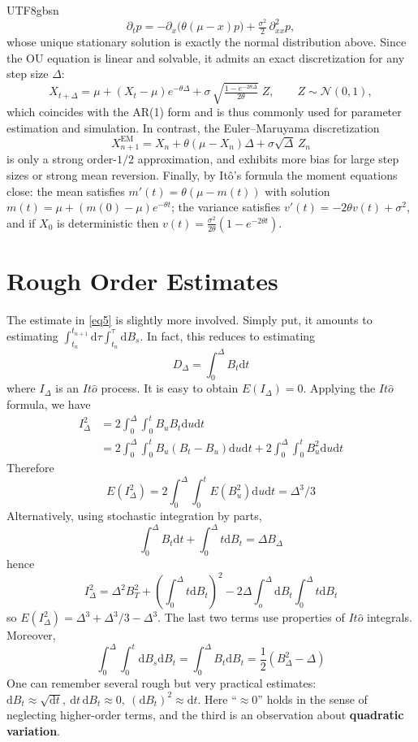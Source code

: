 \documentclass{article}
\begin{document}
\begin{CJK*}{UTF8}{gbsn}
\[
  \partial_t p = -\partial_x\!\big(\theta(\mu-x)p\big)+\tfrac{\sigma^2}{2}\,\partial_{xx}^2 p,
\]
whose unique stationary solution is exactly the normal distribution above. Since the OU equation is linear and solvable, it admits an exact discretization for any step size $\Delta$:
\[
  X_{t+\Delta}=\mu+(X_t-\mu)e^{-\theta\Delta}
  +\sigma\,\sqrt{\tfrac{1-e^{-2\theta\Delta}}{2\theta}}\;Z,\qquad Z\sim\mathcal{N}(0,1),
\]
which coincides with the AR(1) form and is thus commonly used for parameter estimation and simulation. In contrast, the Euler–Maruyama discretization
\[
  X_{n+1}^{\text{EM}}=X_n+\theta(\mu-X_n)\Delta+\sigma\sqrt{\Delta}\,Z_n
\]
is only a strong order-$1/2$ approximation, and exhibits more bias for large step sizes or strong mean reversion. Finally, by Itô’s formula the moment equations close: the mean satisfies $m'(t)=\theta(\mu-m(t))$ with solution $m(t)=\mu+(m(0)-\mu)e^{-\theta t}$; the variance satisfies $v'(t)=-2\theta v(t)+\sigma^2$, and if $X_0$ is deterministic then $v(t)=\frac{\sigma^2}{2\theta}(1-e^{-2\theta t})$.

\appendix
\section{Rough Order Estimates\label{AppendixA}}
The estimate in \ref{eq5} is slightly more involved. Simply put, it amounts to estimating $\int_{t_n}^{t_{n+1}}\mathrm{d}\tau\int_{t_n}^\tau\mathrm{d}B_s$. In fact, this reduces to estimating
$$
D_\Delta=\int_{0}^{\Delta} B_t\mathrm{d}t
$$
where $I_\Delta$ is an $It\hat{o}$ process. It is easy to obtain $E(I_\Delta)=0$. Applying the $It\hat{o}$ formula, we have
$$\begin{aligned}
I_\Delta^2
&=2\int_0^\Delta\int_0^tB_uB_t\mathrm{d}u\mathrm{d}t\\
&=2\int^\Delta_0\int_0^t B_u(B_t-B_u)\mathrm{d}u\mathrm{d}t+2\int^\Delta_0\int_0^t B_u^2\mathrm{d}u\mathrm{d}t
\end{aligned}$$
Therefore
$$
E(I_\Delta^2)=2\int^\Delta_0\int_0^t E(B_u^2)\mathrm{d}u\mathrm{d}t=\Delta^3/3
$$
Alternatively, using stochastic integration by parts,
$$
\int_0^\Delta B_t\mathrm{d}t+\int_0^\Delta t\mathrm{d}B_t=\Delta B_\Delta
$$
hence
$$
I_\Delta^2=\Delta^2B_T^2+(\int_0^\Delta t\mathrm{d}B_t)^2-2\Delta\int_o^\Delta\mathrm{d}B_t\int_0^\Delta t\mathrm{d}B_t
$$
so $E(I_\Delta^2)=\Delta^3+\Delta^3/3-\Delta^3$. The last two terms use properties of $It\hat{o}$ integrals.
Moreover,
$$
\int_0^\Delta\int_0^t\mathrm{d}B_s\mathrm{d}B_t=\int_0^\Delta B_t\mathrm{d}B_t=\frac{1}{2}(B_\Delta^2-\Delta)
$$
One can remember several rough but very practical estimates: $\mathrm{d}B_t\approx\sqrt{\mathrm{d}t},\ \mathrm{d}t\,\mathrm{d}B_t\approx0,\ (\mathrm{d}B_t)^2\approx\mathrm{d}t$. Here “$\approx0$” holds in the sense of neglecting higher-order terms, and the third is an observation about \textbf{quadratic variation}.


\end{CJK*}
\end{document}

